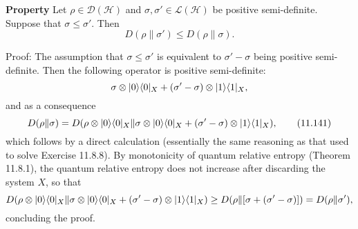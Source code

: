 \textbf{Property}
Let $\rho \in \mathcal{D}(\mathcal{H})$ and $\sigma, \sigma' \in \mathcal{L}(\mathcal{H})$ be positive semi-definite. Suppose that $\sigma \leq \sigma'$. Then
\[
D(\rho \| \sigma') \leq D(\rho \| \sigma).
\]


Proof:
The assumption that $\sigma \leq \sigma'$ is equivalent to $\sigma' - \sigma$ being positive semi-definite. Then the following operator is positive semi-definite: 
\[
\sigma \otimes \lvert0\rangle\langle0\rvert_X + (\sigma' - \sigma) \otimes \lvert1\rangle\langle1\rvert_X,
\]
and as a consequence
\[
D(\rho \| \sigma) = D(\rho \otimes \lvert0\rangle\langle0\rvert_X \| \sigma \otimes \lvert0\rangle\langle0\rvert_X + (\sigma' - \sigma) \otimes \lvert1\rangle\langle1\rvert_X), \tag{11.141}
\]
which follows by a direct calculation (essentially the same reasoning as that used to solve Exercise 11.8.8). By monotonicity of quantum relative entropy (Theorem 11.8.1), the quantum relative entropy does not increase after discarding the system $X$, so that
\[
D(\rho \otimes \lvert0\rangle\langle0\rvert_X \| \sigma \otimes \lvert0\rangle\langle0\rvert_X + (\sigma' - \sigma) \otimes \lvert1\rangle\langle1\rvert_X)
\geq D(\rho \| [\sigma + (\sigma' - \sigma)]) = D(\rho \| \sigma'),
\]
concluding the proof.

